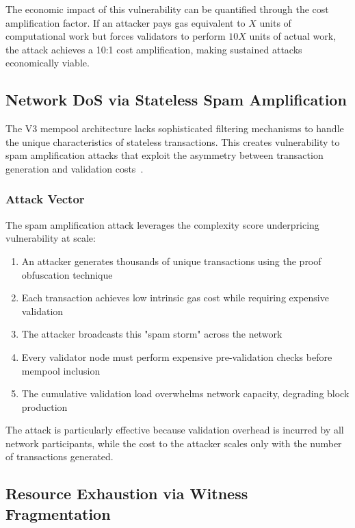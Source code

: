 \documentclass{article}
\begin{document}
The economic impact of this vulnerability can be quantified through the cost amplification factor. If an attacker pays gas equivalent to $X$ units of computational work but forces validators to perform $10X$ units of actual work, the attack achieves a 10:1 cost amplification, making sustained attacks economically viable.

\subsection{Network DoS via Stateless Spam Amplification}

The V3 mempool architecture lacks sophisticated filtering mechanisms to handle the unique characteristics of stateless transactions. This creates vulnerability to spam amplification attacks that exploit the asymmetry between transaction generation and validation costs~\cite{ding2023mempool}.

\subsubsection{Attack Vector}

The spam amplification attack leverages the complexity score underpricing vulnerability at scale:

\begin{enumerate}
\item An attacker generates thousands of unique transactions using the proof obfuscation technique
\item Each transaction achieves low intrinsic gas cost while requiring expensive validation
\item The attacker broadcasts this "spam storm" across the network
\item Every validator node must perform expensive pre-validation checks before mempool inclusion
\item The cumulative validation load overwhelms network capacity, degrading block production
\end{enumerate}

The attack is particularly effective because validation overhead is incurred by all network participants, while the cost to the attacker scales only with the number of transactions generated.

\subsection{Resource Exhaustion via Witness Fragmentation}
\end{document}
